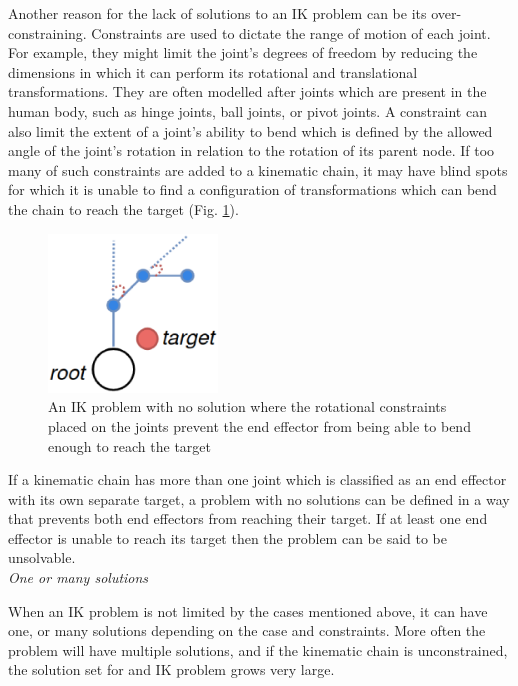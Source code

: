 Another reason for the lack of solutions to an IK problem can be its
over-constraining. Constraints are used to dictate the range of motion of
each joint. For example, they might limit the joint's degrees of freedom by
reducing the dimensions in which it can perform its rotational and translational
transformations. They are often modelled after joints which are present in the
human body, such as hinge joints, ball joints, or pivot joints. A constraint can
also limit the extent of a joint's ability to bend which is defined by the
allowed angle of the joint's rotation in relation to the rotation of its parent
node. If too many of such constraints are added to a kinematic chain, it may
have blind spots for which it is unable to find a configuration of
transformations which can bend the chain to reach the target (Fig.
\ref{fig:unreachable_angles}).

\begin{figure}
    \centering
    \captionsetup{justification=centering}
    \includegraphics[width=0.4\textwidth]{grafika/unreachable_angles.eps}
    \caption{An IK problem with no solution where the rotational constraints
    placed on the joints prevent the end effector from being able to bend enough
    to reach the target}
    \label{fig:unreachable_angles}
\end{figure}

If a kinematic chain has more than one joint which is classified as an end
effector with its own separate target, a problem with no solutions can be
defined in a way that prevents both end effectors from reaching their target.
If at least one end effector is unable to reach its target then the problem can
be said to be unsolvable. \\

\noindent\textit{One or many solutions}

When an IK problem is not limited by the cases mentioned above, it can have one,
or many solutions depending on the case and constraints. More often the
problem will have multiple solutions, and if the kinematic chain is
unconstrained, the solution set for and IK problem grows very large.

